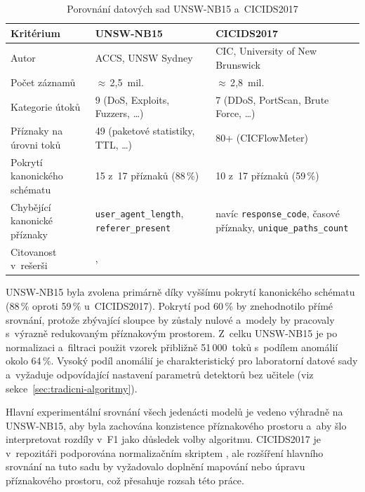 \begin{table}[htbp]
\centering
\caption{Porovnání datových sad UNSW-NB15 a~CICIDS2017}
\label{tab:dataset-comparison}
\small
\begin{tabular}{p{4cm}p{4.5cm}p{4.5cm}}
\toprule
Kritérium & UNSW-NB15 & CICIDS2017 \\
\midrule
Autor & ACCS, UNSW Sydney & CIC, University of New Brunswick \\
Počet záznamů & $\approx$\,2{,}5~mil. & $\approx$\,2{,}8~mil. \\
Kategorie útoků & 9 (DoS, Exploits, Fuzzers, \ldots) & 7 (DDoS, PortScan, Brute Force, \ldots) \\
Příznaky na úrovni toků & 49 (paketové statistiky, TTL, \ldots) & 80+ (CICFlowMeter) \\
Pokrytí kanonického schématu & 15 z~17 příznaků (88\,\%) & 10 z~17 příznaků (59\,\%) \\
Chybějící kanonické příznaky & \texttt{user\_agent\_length}, \texttt{referer\_present} & navíc \texttt{response\_code}, časové příznaky, \texttt{unique\_paths\_count} \\
Citovanost v~rešerši & \textcite{Barut2020}, \textcite{Ji2024} & \textcite{Bakhshi2021} \\
\bottomrule
\end{tabular}
\end{table}

UNSW-NB15 byla zvolena primárně díky vyššímu pokrytí kanonického schématu (88\,\% oproti 59\,\% u~CICIDS2017). Pokrytí pod 60\,\% by znehodnotilo přímé srovnání, protože zbývající sloupce by zůstaly nulové a~modely by pracovaly s~výrazně redukovaným příznakovým prostorem. Z~celku UNSW-NB15 je po normalizaci a~filtraci použit vzorek přibližně 51\,000~toků s~podílem anomálií okolo 64\,\%. Vysoký podíl anomálií je charakteristický pro laboratorní datové sady a~vyžaduje odpovídající nastavení parametrů detektorů bez učitele (viz sekce~\ref{sec:tradicni-algoritmy}).

Hlavní experimentální srovnání všech jedenácti modelů je vedeno výhradně na UNSW-NB15, aby byla zachována konzistence příznakového prostoru a~aby šlo interpretovat rozdíly v~F1 jako důsledek volby algoritmu. CICIDS2017 je v~repozitáři podporována normalizačním skriptem , ale rozšíření hlavního srovnání na tuto sadu by vyžadovalo doplnění mapování nebo úpravu příznakového prostoru, což přesahuje rozsah této práce.

